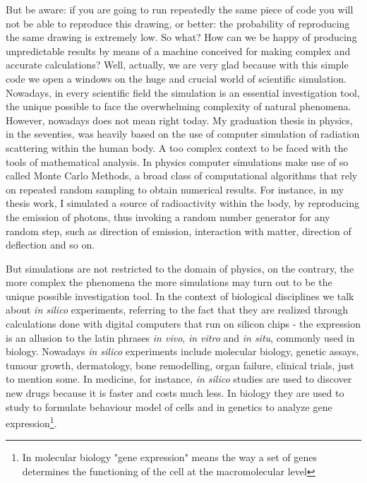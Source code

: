 But be aware: if you are going to run repeatedly the same piece of code you will not be able to reproduce this drawing, or better: the probability of reproducing the same drawing is extremely low. So what? How can we be happy of producing unpredictable results by means of a machine conceived for making complex and accurate calculations? Well, actually, we are very glad because with this simple code we open a windows on the huge and crucial world of scientific simulation. Nowadays, in every scientific field the simulation is an essential investigation tool, the unique possible to face the overwhelming complexity of natural phenomena. However, nowadays does not mean right today. My graduation thesis in physics, in the seventies, was heavily based on the use of computer simulation of radiation scattering within the human body. A too complex context to be faced with the tools of mathematical analysis. In physics computer simulations make use of so called Monte Carlo Methods, a broad class of computational algorithms that rely on repeated random sampling to obtain numerical results. For instance, in my thesis work, I simulated a source of radioactivity within the body, by reproducing the emission of photons, thus invoking a random number generator for any random step, such as direction of emission, interaction with matter, direction of deflection and so on.

But simulations are not restricted to the domain of physics, on the contrary, the more complex the phenomena the more simulations may turn out to be the unique possible investigation tool. In the context of biological disciplines we talk about \textit{in silico} experiments, referring to the fact that they are realized through calculations done with digital computers that run on silicon chips - the expression is an allusion to the latin phrases \textit{in vivo}, \textit{in vitro} and \textit{in situ}, commonly used in biology. Nowadays \textit{in silico} experiments include molecular biology, genetic assays, tumour growth, dermatology, bone remodelling, organ failure, clinical trials, just to mention some. In medicine, for instance, \textit{in silico} studies are used to discover new drugs because it is faster and costs much less. In biology they are used to study to formulate behaviour model of cells and in genetics to analyze gene expression\footnote{In molecular biology "gene expression" means the way a set of genes determines the functioning of the cell at the macromolecular level}.

